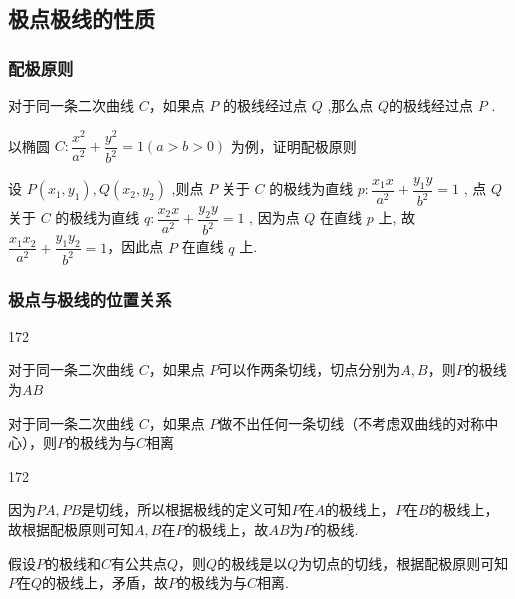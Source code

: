 \subsection*{极点极线的性质}
\subsubsection*{配极原则}
对于同一条二次曲线 $C$，如果点 $P$ 的极线经过点 $Q$ ,那么点 $Q$的极线经过点 $P$ .

以椭圆 $C : \dfrac{{x}^{2}}{{a}^{2}} + \dfrac{{y}^{2}}{{b}^{2}} = 1\left( {a > b > 0}\right)$ 为例，证明配极原则
\begin{jieda}
    设 $P\left( {{x}_{1},{y}_{1}}\right) ,Q\left( {{x}_{2},{y}_{2}}\right)$ ,则点 $P$ 关于 $C$ 的极线为直线 $p : \dfrac{{x}_{1}x}{{a}^{2}} + \dfrac{{y}_{1}y}{{b}^{2}} = 1$ ,
    点 $Q$ 关于 $C$ 的极线为直线 $q : \dfrac{{x}_{2}x}{{a}^{2}} + \dfrac{{y}_{2}y}{{b}^{2}} = 1$ ,
    因为点 $Q$ 在直线 $p$ 上, 故$\dfrac{{x}_{1}{x}_{2}}{{a}^{2}} + \dfrac{{y}_{1}{y}_{2}}{{b}^{2}} = 1$，因此点 $P$ 在直线 $q$ 上.
\end{jieda}

\subsubsection*{极点与极线的位置关系}
\begin{dingautolist}{172}
    \item 对于同一条二次曲线 $C$，如果点 $P$可以作两条切线，切点分别为$A,B$，则$P$的极线为$AB$
    \item 对于同一条二次曲线 $C$，如果点 $P$做不出任何一条切线（不考虑双曲线的对称中心），则$P$的极线为与$C$相离
\end{dingautolist}
\begin{jieda}
    \begin{dingautolist}{172}
        \item 因为$PA, PB$是切线，所以根据极线的定义可知$P$在$A$的极线上，$P$在$B$的极线上，故根据配极原则可知$A,B$在$P$的极线上，故$AB$为$P$的极线.
        \item 假设$P$的极线和$C$有公共点$Q$，则$Q$的极线是以$Q$为切点的切线，根据配极原则可知$P$在$Q$的极线上，矛盾，故$P$的极线为与$C$相离.
    \end{dingautolist}
\end{jieda}

